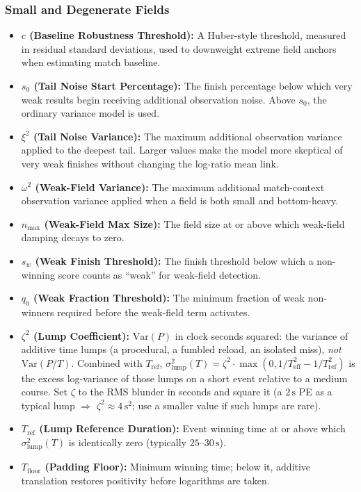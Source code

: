 \documentclass[12pt]{article}
\newcommand{\zetai}{\zeta^2}                    %
\newcommand{\slump}{\sigma_{\mathrm{lump}}^2}  %
\newcommand{\tref}{T_{\mathrm{ref}}}
\newcommand{\tfloor}{T_{\mathrm{floor}}}
\begin{document}
	\subsubsection*{Small and Degenerate Fields}
	\begin{itemize}
		\item \textbf{$c$ (Baseline Robustness Threshold):} A Huber-style threshold, measured in residual standard deviations, used to downweight extreme field anchors when estimating match baseline.
		\item \textbf{$s_0$ (Tail Noise Start Percentage):} The finish percentage below which very weak results begin receiving additional observation noise. Above $s_0$, the ordinary variance model is used.
		\item \textbf{$\xi^2$ (Tail Noise Variance):} The maximum additional observation variance applied to the deepest tail. Larger values make the model more skeptical of very weak finishes without changing the log-ratio mean link.
		\item \textbf{$\omega^2$ (Weak-Field Variance):} The maximum additional match-context observation variance applied when a field is both small and bottom-heavy.
		\item \textbf{$n_{\mathrm{max}}$ (Weak-Field Max Size):} The field size at or above which weak-field damping decays to zero.
		\item \textbf{$s_w$ (Weak Finish Threshold):} The finish threshold below which a non-winning score counts as ``weak'' for weak-field detection.
		\item \textbf{$q_0$ (Weak Fraction Threshold):} The minimum fraction of weak non-winners required before the weak-field term activates.
		\item \textbf{$\zetai$ (Lump Coefficient):} $\mathrm{Var}(P)$ in clock seconds squared: the variance of additive time lumps (a procedural, a fumbled reload, an isolated miss), \emph{not} $\mathrm{Var}(P/T)$. Combined with $\tref$, $\slump(T) = \zetai \cdot \max(0, 1/T_{\mathrm{eff}}^2 - 1/\tref^2)$ is the excess log-variance of those lumps on a short event relative to a medium course. Set $\zeta$ to the RMS blunder in seconds and square it (a $2\,\mathrm{s}$ PE as a typical lump $\Rightarrow$ $\zetai \approx 4\,\mathrm{s}^2$; use a smaller value if such lumps are rare).
		\item \textbf{$\tref$ (Lump Reference Duration):} Event winning time at or above which $\slump(T)$ is identically zero (typically $25$--$30\,\mathrm{s}$).
		\item \textbf{$\tfloor$ (Padding Floor):} Minimum winning time; below it, additive translation restores positivity before logarithms are taken.
	\end{itemize}
\end{document}
